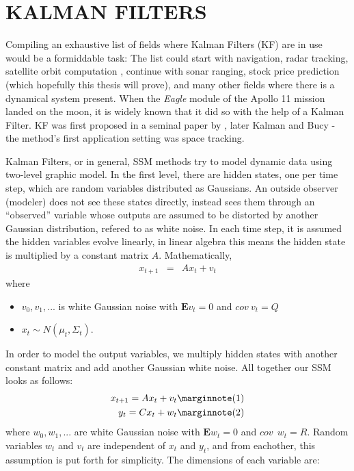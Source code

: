 \chapter{KALMAN FILTERS}

Compiling an exhaustive list of fields where Kalman Filters (KF) are in use
would be a formiddable task: The list could start with navigation, radar
tracking, satellite orbit computation \cite{welling}, continue with sonar
ranging, stock price prediction (which hopefully this thesis will prove), and
many other fields where there is a dynamical system present. When the {\em
  Eagle} module of the Apollo 11 mission landed on the moon, it is widely known
that it did so with the help of a Kalman Filter. KF was first proposed in a
seminal paper by \cite{kalman}, later Kalman and Bucy \cite{kalman2} - the
method's first application setting was space tracking.

Kalman Filters, or in general, SSM methods try to model dynamic data using
two-level graphic model. In the first level, there are hidden states, one per
time step, which are random variables distributed as Gaussians. An outside
observer (modeler) does not see these states directly, instead sees them through
an ``observed'' variable whose outputs are assumed to be distorted by another
Gaussian distribution, refered to as white noise. In each time step, it is
assumed the hidden variables evolve linearly, in linear algebra this means the
hidden state is multiplied by a constant matrix $A$. Mathematically,
\begin{eqnarray*}
x_{t+1} &=& Ax_t + v_t 
\end{eqnarray*}
where
\begin{itemize}
   \item $v_0,v_1,...$ is white Gaussian noise with $\mathbf{E}v_t = 0$ and $cov
   \: v_t = Q$
   \item $x_t \sim N(\mu_t, \Sigma_t)$.
\end{itemize}
In order to model the output variables, we multiply hidden states with another
constant matrix and add another Gaussian white noise. All together our SSM looks
as follows:
\begin{eqnarray}
x_{t+1} = Ax_t + v_t \mlabel{1}\\
y_t = Cx_t + w_t \mlabel{2}
\end{eqnarray}
where $w_0,w_1,...$ are white Gaussian noise with $\mathbf{E}w_t = 0$ and $cov
\:\: w_t = R$. Random variables $w_t$ and $v_t$ are independent of $x_t$
and $y_t$, and from eachother, this assumption is put forth for simplicity. The
dimensions of each variable are:

